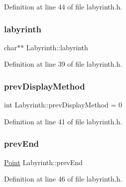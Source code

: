 Definition at line 44 of file labyrinth.\+h.

\mbox{\label{class_labyrinth_ac95a1b4246b9351e8cea8c1618bcb58d}} 
\subsubsection{\texorpdfstring{labyrinth}{labyrinth}}
{\footnotesize\ttfamily char$\ast$$\ast$ Labyrinth\+::labyrinth\hspace{0.3cm}{\ttfamily [private]}}



Definition at line 39 of file labyrinth.\+h.

\mbox{\label{class_labyrinth_a7ddef18e25e03408485e4959bcb5aebc}} 
\subsubsection{\texorpdfstring{prevDisplayMethod}{prevDisplayMethod}}
{\footnotesize\ttfamily int Labyrinth\+::prev\+Display\+Method = 0\hspace{0.3cm}{\ttfamily [private]}}



Definition at line 41 of file labyrinth.\+h.

\mbox{\label{class_labyrinth_a9041d96d4328dea374deb81ff08bd35c}} 
\subsubsection{\texorpdfstring{prevEnd}{prevEnd}}
{\footnotesize\ttfamily \mbox{\hyperlink{common_8h_aa9cfdb80b4ca12013a2de8a3b9b97981}{Point}} Labyrinth\+::prev\+End\hspace{0.3cm}{\ttfamily [private]}}



Definition at line 46 of file labyrinth.\+h.

\mbox{\label{class_labyrinth_a23e08d55e3a627e8a0d828d05be03253}} 
